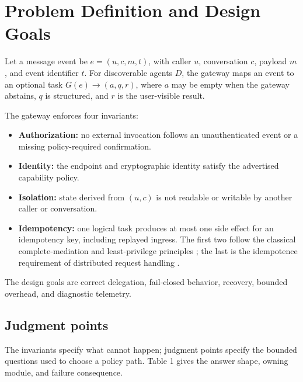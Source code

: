 \documentclass[runningheads,a4paper]{llncs}
\begin{document}
\section{Problem Definition and Design Goals}

Let a message event be \(e=(u,c,m,t)\), with caller \(u\), conversation \(c\), payload \(m\), and event identifier \(t\). For discoverable agents \(D\), the gateway maps an event to an optional task \(G(e)\rightarrow(a,q,r)\), where \(a\) may be empty when the gateway abstains, \(q\) is structured, and \(r\) is the user-visible result.

The gateway enforces four invariants:

\begin{itemize}

\item \textbf{Authorization:} no external invocation follows an unauthenticated event or a missing policy-required confirmation.

\item \textbf{Identity:} the endpoint and cryptographic identity satisfy the advertised capability policy.

\item \textbf{Isolation:} state derived from \((u,c)\) is not readable or writable by another caller or conversation.

\item \textbf{Idempotency:} one logical task produces at most one side effect for an idempotency key, including replayed ingress. The first two follow the classical complete-mediation and least-privilege principles \cite{saltzer1975protection}; the last is the idempotence requirement of distributed request handling \cite{helland2012idempotence}.

\end{itemize}

The design goals are correct delegation, fail-closed behavior, recovery, bounded overhead, and diagnostic telemetry.

\subsection{Judgment points}

The invariants specify what cannot happen; judgment points specify the bounded questions used to choose a policy path. Table 1 gives the answer shape, owning module, and failure consequence.
\end{document}
